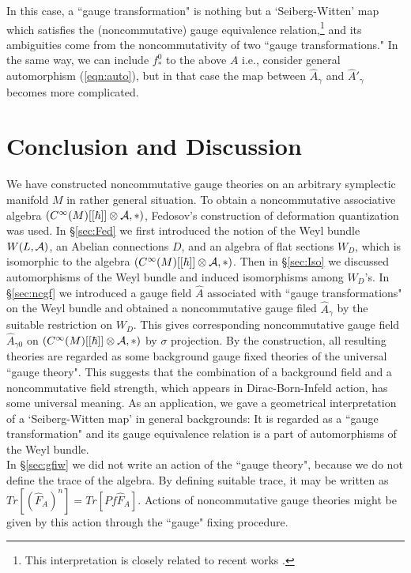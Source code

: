 \documentclass[10pt,a4paper]{article}
\def\h{\hbar}
\def\hA{{\hat A}}
\begin{document}
In this case, a ``gauge transformation" is nothing but a `Seiberg-Witten' map which satisfies the (noncommutative) gauge equivalence relation,\footnote{
          This interpretation is closely related to recent works \cite{Cor}\cite{Oku}\cite{CHL}\cite{JS}.
} and its ambiguities come from the noncommutativity of two ``gauge transformations." In the same way, we can include  $f^0_*$ to the above $A$ i.e., consider general automorphism (\ref{eqn:auto}), but in that case the map between ${\hat A}_{\gamma}$ and ${\hat A'}_{\gamma}$ becomes more complicated.



\section{Conclusion and Discussion
\label{sec:CD}}

We have constructed noncommutative gauge theories on an arbitrary symplectic manifold $M$ in rather general situation. To obtain a noncommutative associative algebra $(C^\infty(M)[[\h]]\otimes {\cal A},*)$, Fedosov's construction \cite{Fedbk} of deformation quantization was used. In \S\ref{sec:Fed} we first introduced the notion of the Weyl bundle $W(L,{\cal A})$, an Abelian connections $D$, and an algebra of flat sections $W_D$, which is isomorphic to the algebra $(C^\infty(M)[[\h]]\otimes {\cal A},*)$. Then in \S\ref{sec:Iso} we discussed automorphisms of the Weyl bundle and induced isomorphisms among $W_D$'s. In \S\ref{sec:ncgf} we introduced a gauge field $\hA$ associated with ``gauge transformations" on the Weyl bundle and obtained a noncommutative gauge filed ${\hA}_\gamma$ by the suitable restriction on $W_D$. This gives corresponding noncommutative gauge field $\hA_{\gamma0}$ on $(C^\infty(M)[[\h]]\otimes {\cal A},*)$ by $\sigma$ projection. By the construction, all resulting theories are regarded as some background gauge fixed theories of the universal ``gauge theory". This suggests that the combination of a background field and a noncommutative field strength, which appears in Dirac-Born-Infeld action, has some universal meaning. 
As an application, we gave a geometrical interpretation of a `Seiberg-Witten map' in general backgrounds: It is regarded as a ``gauge transformation" and its gauge equivalence relation is a part of automorphisms of the Weyl bundle.\\

In \S\ref{sec:gfiw} we did not write an action of the ``gauge theory", because we do not define the trace of the algebra. By defining suitable trace, it may be written as $Tr[({\hat F}_A)^n]=Tr[Pf{\hat F}_A]$. Actions of noncommutative gauge theories might be given by this action through the ``gauge" fixing procedure. \\
\end{document}

